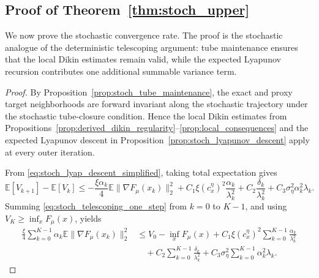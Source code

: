 \documentclass{article}
\begin{document}
\subsection{Proof of Theorem~\ref{thm:stoch_upper}}
\label{app:proof_stochastic}

We now prove the stochastic convergence rate. The proof is the stochastic analogue of the
deterministic telescoping argument: tube maintenance ensures that the local Dikin estimates remain
valid, while the expected Lyapunov recursion contributes one additional summable variance term.

\begin{proof}
By Proposition~\ref{prop:stoch_tube_maintenance}, the exact and proxy target neighborhoods are forward
invariant along the stochastic trajectory under the stochastic tube-closure condition. Hence the local
Dikin estimates from Propositions~\ref{prop:derived_dikin_regularity}--\ref{prop:local_consequences}
and the expected Lyapunov descent in Proposition~\ref{prop:stoch_lyapunov_descent} apply at every
outer iteration.

From \eqref{eq:stoch_lyap_descent_simplified}, taking total expectation gives
\begin{equation}
\label{eq:stoch_telescoping_one_step}
\mathbb E[V_{k+1}]-\mathbb E[V_k]
\le
-\frac{\xi\alpha_k}{4}\mathbb E\|\nabla F_\mu(x_k)\|_2^2
+
C_1\xi(c_x^\eta)^2\frac{\alpha_k}{\lambda_k^2}
+
C_2\frac{\delta_k}{\lambda_k^2}
+
C_3\sigma_\eta^2\alpha_k^2\lambda_k .
\end{equation}
Summing \eqref{eq:stoch_telescoping_one_step} from \(k=0\) to \(K-1\), and using
\(V_K\ge \inf_x F_\mu(x)\), yields
\begin{align}
\frac{\xi}{4}
\sum_{k=0}^{K-1}
\alpha_k\mathbb E\|\nabla F_\mu(x_k)\|_2^2
&\le
V_0-\inf_x F_\mu(x)
+
C_1\xi(c_x^\eta)^2
\sum_{k=0}^{K-1}\frac{\alpha_k}{\lambda_k^2}
\nonumber\\
&\quad
+
C_2
\sum_{k=0}^{K-1}\frac{\delta_k}{\lambda_k^2}
+
C_3\sigma_\eta^2
\sum_{k=0}^{K-1}\alpha_k^2\lambda_k .
\label{eq:stoch_telescoping}
\end{align}


\end{proof}
\end{document}
